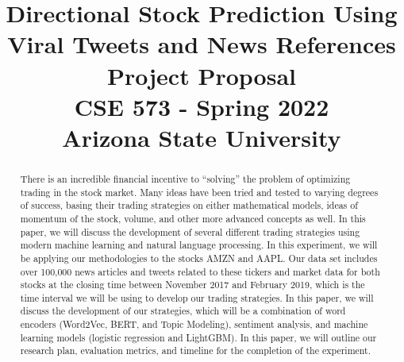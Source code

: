 \documentclass[conference]{IEEEtran}
\begin{document}
\title{%
  Directional Stock Prediction Using Viral Tweets and News References 
\\[.3in]
  \large Project Proposal \\
CSE 573 - Spring 2022 \\ 
Arizona State University \\
}


\author{
    \and
    \and
    \and
    \and

}




\maketitle

\begin{abstract}
    There is an incredible financial incentive to “solving” the problem of optimizing trading in the stock market. Many ideas have been tried and tested to varying degrees of success, basing their trading strategies on either mathematical models, ideas of momentum of the stock, volume, and other more advanced concepts as well. In this paper, we will discuss the development of several different trading strategies using modern machine learning and natural language processing. In this experiment, we will be applying our methodologies to the stocks AMZN and AAPL. Our data set includes over 100,000 news articles and tweets related to these tickers and market data for both stocks at the closing time between November 2017 and February 2019, which is the time interval we will be using to develop our trading strategies. In this paper, we will discuss the development of our strategies, which will be a combination of word encoders (Word2Vec, BERT, and Topic Modeling), sentiment analysis, and machine learning models (logistic regression and LightGBM). In this paper, we will outline our research plan, evaluation metrics, and timeline for the completion of the experiment.
\end{abstract}
\end{document}
